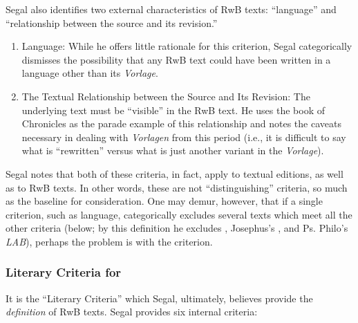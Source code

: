 Segal also identifies two external characteristics of RwB texts: ``language'' and ``relationship between the source and its revision.'' 

 \begin{enumerate}
    \item   Language: While he offers little rationale for this criterion, Segal categorically dismisses the possibility that any RwB text could have been written in a language other than its \emph{Vorlage}.

    \item The Textual Relationship between the Source and Its Revision: The underlying text must be ``visible'' in the RwB text. He uses the book of Chronicles as the parade example of this relationship and notes the caveats necessary in dealing with \emph{Vorlagen} from this period (i.e., it is difficult to say what is ``rewritten'' versus what is just another variant in the \emph{Vorlage}).
\end{enumerate} 

Segal notes that both of these criteria, in fact, apply to textual editions, as well as to RwB texts.%
    \autocite[20]{segal_henze2005}
In other words, these are not ``distinguishing'' criteria, so much as the baseline for consideration. One may demur, however, that if a single criterion, such as language, categorically excludes several texts which meet all the other criteria (below; by this definition he excludes \ga, Josephus's \ant, and Ps. Philo's \emph{LAB}), perhaps the problem is with the criterion.

\subsubsection{Literary Criteria for \RWB}

It is the ``Literary Criteria'' which Segal, ultimately, believes provide the \emph{definition} of RwB texts.%
    \autocite[20]{segal_henze2005}
Segal provides six internal criteria: 


